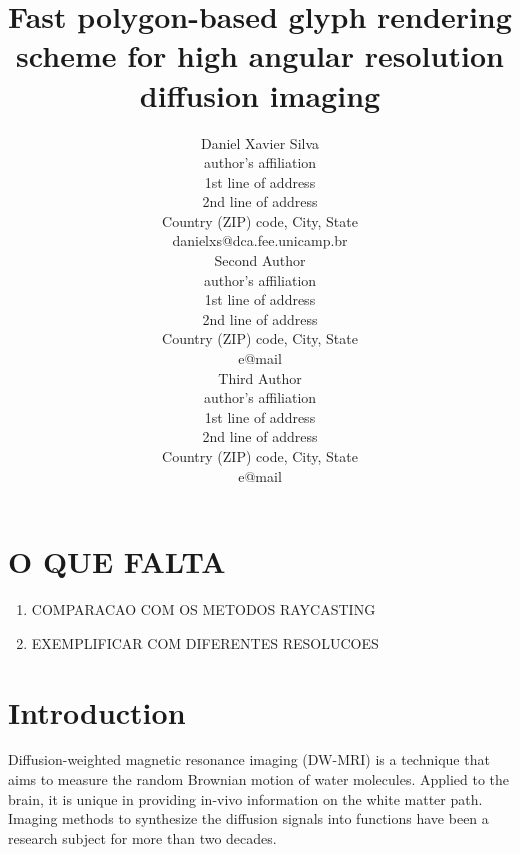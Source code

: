 \documentclass[twoside,twocolumn,10pt]{article}
\title{Fast polygon-based glyph rendering scheme for high angular resolution diffusion imaging}
\author{
\parbox{0.25\textwidth}{\centering
Daniel Xavier Silva\\[1mm]
author's affiliation\\
1st line of address\\
2nd line of address\\
Country (ZIP) code, City, State\\[1mm]
danielxs@dca.fee.unicamp.br
}
\hspace{0.05\textwidth}
\parbox{0.25\textwidth}{\centering
Second Author\\[1mm]
author's affiliation\\
1st line of address\\
2nd line of address\\
Country (ZIP) code, City, State\\[1mm]
e@mail
}
\hspace{0.05\textwidth}
\parbox{0.25\textwidth}{\centering
Third Author\\[1mm]
author's affiliation\\
1st line of address\\
2nd line of address\\
Country (ZIP) code, City, State\\[1mm]
e@mail
}
}
\begin{document}



\section{O QUE FALTA}
\begin{enumerate}
    \item COMPARACAO COM OS METODOS RAYCASTING
    \item EXEMPLIFICAR COM DIFERENTES RESOLUCOES
    
\end{enumerate}


\section{Introduction}

\copyrightspace

Diffusion-weighted magnetic resonance imaging (DW-MRI) is a technique that aims to measure the random Brownian motion of water molecules. Applied to the brain, it is unique in providing in-vivo information on the white matter path. Imaging methods to synthesize the diffusion signals into functions have been a research subject for more than two decades.
\end{document}
